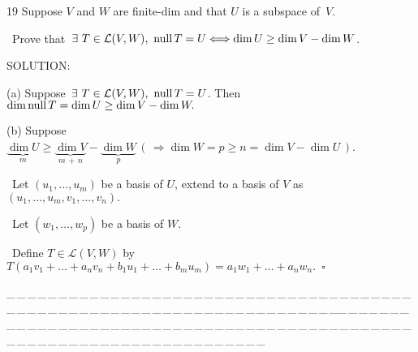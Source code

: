\documentclass[a4paper, 11pt, UTF8]{article}
\def\null{\textup{null\,}}
\def\Lm{\mathcal{L}}
\begin{document}
\begin{large}
{\timesbf\Large 19} {\timessl\Large 
Suppose $V$ and $W$ are finite-dim and that $U$ is a subspace of \,$V$.}\par\quad\,
{\timessl\Large Prove that $\,\exists\,\,T\in\Lm(V, W),\,\,\null T = U\Longleftrightarrow\dim U\geq\dim V-\dim W$.
}\par
{\timesbf S\footnotesize{OLUTION:}}\par\quad
(a) Suppose $\,\exists\,\,T\in\Lm(V, W),\,\,\null T = U$. Then $\dim\null T=\dim U\geq\dim V-\dim W.$\par\quad
(b) Suppose $\underbrace{\dim U}_{m}\geq\underbrace{\dim V}_{m\,+\,n}-\underbrace{\dim W}_{p}\,(\,\Rightarrow\dim W=p\geq n=\dim V-\dim U\,)$.\par\qquad\,
Let $(u_1,\dots,u_m)$ be a basis of $U$, extend to a basis of $V$ as $(u_1,\dots,u_m,v_1,\dots,v_n).$\par\qquad\,
Let $(w_1,\dots,w_p)$ be a basis of $W$.\par\qquad\,
Define $T\in\Lm(V,W)$ by $T(a_1 v_1+\dots+a_n v_n+b_1 u_1+\dots+b_m u_m)=a_1 w_1+\dots+a_n w_n.\,\,\,\square$\par
{\tiny \_\,\_\,\_\,\_\,\_\,\_\,\_\,\_\,\_\,\_\,\_\,\_\,\_\,\_\,\_\,\_\,\_\,\_\,\_\,\_\,\_\,\_\,\_\,\_\,\_\,\_\,\_\,\_\,\_\,\_\,\_\,\_\,\_\,\_\,\_\,\_\,\_\,\_\,\_\,\_\,\_\,\_\,\_\,\_\,\_\,\_\,\_\,\_\,\_\,\_\,\_\,\_\,\_\,\_\,\_\,\_\,\_\,\_\,\_\,\_\,\_\,\_\,\_\,\_\,\_\,\_\,\_\,\_\,\_\,\_\,\_\_\,\_\,\_\,\_\,\_\,\_\,\_\,\_\,\_\,\_\,\_\,\_\,\_\,\_\,\_\,\_\,\_\,\_\,\_\,\_\,\_\,\_\,\_\,\_\,\_\,\_\,\_\,\_\,\_\,\_\,\_\,\_\,\_\,\_\,\_\,\_\,\_\,\_\,\_\,\_\,\_\,\_\,\_\,\_\,\_\,\_\,\_\,\_\,\_\,\_\,\_\,\_\,\_\,\_\,\_\,\_\,\_\,\_\,\_\,\_\,\_\,\_\,\_\,\_\,\_\,\_\,\_\,\_\,\_\,\_\,\_}\par


\end{large}
\end{document}
